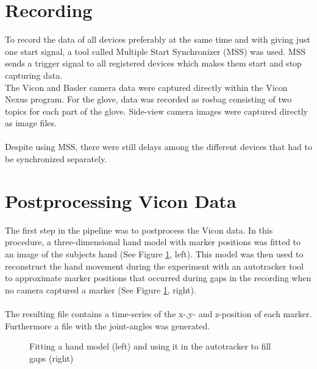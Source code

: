 \section{Recording} \label{recording}
To record the data of all devices preferably at the same time and with giving just one start signal, a tool called Multiple Start Synchronizer (MSS) was used. MSS sends a trigger signal to all registered devices which makes them start and stop capturing data.\\
The Vicon and Basler camera data were captured directly within the Vicon Nexus program. For the glove, data was recorded as rosbag consisting of two topics for each part of the glove. Side-view camera images were captured directly as image files.\\
\\
Despite using MSS, there were still delays among the different devices that had to be synchronized separately. 
\section{Postprocessing Vicon Data}
The first step in the pipeline was to postprocess the Vicon data. In this procedure, a three-dimensional hand model with marker positions was fitted to an image of the subjects hand (See Figure \ref{autotracker}, left). This model was then used to reconstruct the hand movement during the experiment with an autotracker tool \cite{autotracker} to approximate marker positions that occurred during gaps in the recording when no camera captured a marker  (See Figure \ref{autotracker}, right).\\
\\
The resulting file contains a time-series of the x-,y- and z-position of each marker. Furthermore a file with the joint-angles was generated.

\begin{figure}[h]
	\caption{Fitting a hand model (left) and using it in the autotracker to fill gaps (right)}
	\label{autotracker}
\end{figure}
